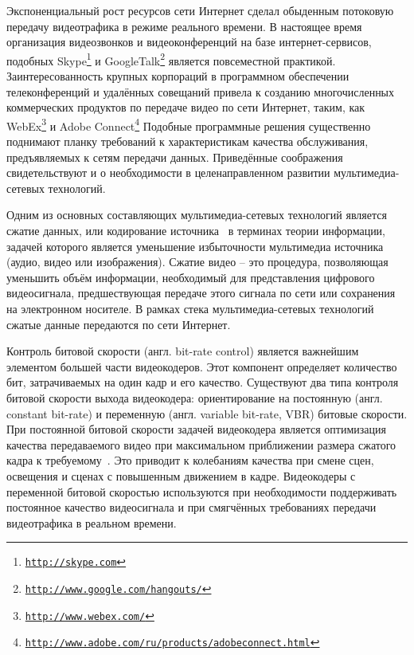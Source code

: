 \label{sec:intro}

Экспоненциальный рост ресурсов сети Интернет
сделал обыденным
потоковую передачу видеотрафика в режиме реального времени.
В настоящее время организация видеозвонков и видеоконференций
на базе интернет-сервисов, подобных Skype\footnote{\texttt{\url{http://skype.com}}} и
GoogleTalk\footnote{\texttt{\url{http://www.google.com/hangouts/}}} является повсеместной практикой.
Заинтересованность крупных корпораций в программном
обеспечении телеконференций и удалённых совещаний
привела к созданию многочисленных коммерческих продуктов
по передаче видео по сети Интернет, таким, как
WebEx\footnote{\texttt{\url{http://www.webex.com/}}}
и Adobe Connect\footnote{\texttt{\url{http://www.adobe.com/ru/products/adobeconnect.html}}}
Подобные программные решения
существенно поднимают планку требований к характеристикам
качества обслуживания, предъявляемых к сетям передачи
данных. Приведённые соображения свидетельствуют и о
необходимости в целенаправленном развитии мультимедиа-сетевых
технологий.

Одним из основных составляющих мультимедиа-сетевых технологий
является сжатие данных, или кодирование источника~\cite{salomoncomp, sklarbook}
в терминах теории информации, задачей которого является
уменьшение избыточности мультимедиа источника (аудио,
видео или изображения). Сжатие видео -- это процедура,
позволяющая уменьшить объём информации, необходимый
для представления цифрового видеосигнала, предшествующая передаче
этого сигнала по сети или сохранения на электронном носителе.
В рамках стека мультимедиа-сетевых технологий сжатые данные
передаются по сети Интернет.

Контроль битовой скорости (англ. bit-rate control) является
важнейшим элементом большей части видеокодеров. Этот
компонент определяет количество бит, затрачиваемых на один
кадр и его качество. Существуют два типа контроля битовой
скорости выхода видеокодера: ориентирование на постоянную
(англ. constant bit-rate) и переменную (англ. variable bit-rate, VBR)
битовые скорости. При постоянной битовой скорости задачей
видеокодера является оптимизация качества передаваемого
видео при максимальном приближении размера сжатого кадра
к требуемому~\cite{survey2013}. Это приводит к колебаниям качества
при смене сцен, освещения и сценах с повышенным
движением в кадре. Видеокодеры с переменной битовой
скоростью используются при необходимости поддерживать постоянное
качество видеосигнала и при смягчённых требованиях
передачи видеотрафика в реальном времени.

